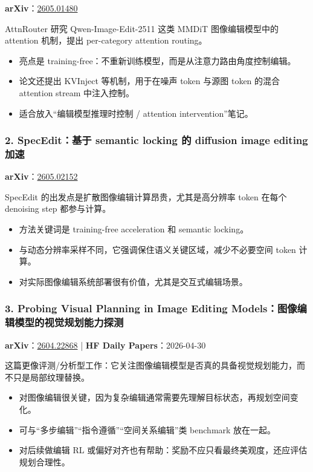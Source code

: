 \textbf{arXiv}：\href{https://arxiv.org/abs/2605.01480}{2605.01480}

AttnRouter 研究 Qwen-Image-Edit-2511 这类 MMDiT 图像编辑模型中的 attention 机制，提出 per-category attention routing。

\begin{itemize}[leftmargin=1.5em]
  \item 亮点是 training-free：不重新训练模型，而是从注意力路由角度控制编辑。
  \item 论文还提出 KVInject 等机制，用于在噪声 token 与源图 token 的混合 attention stream 中注入控制。
  \item 适合放入“编辑模型推理时控制 / attention intervention”笔记。
\end{itemize}

\subsubsection{2. SpecEdit：基于 semantic locking 的 diffusion image editing 加速}

\textbf{arXiv}：\href{https://arxiv.org/abs/2605.02152}{2605.02152}

SpecEdit 的出发点是扩散图像编辑计算昂贵，尤其是高分辨率 token 在每个 denoising step 都参与计算。

\begin{itemize}[leftmargin=1.5em]
  \item 方法关键词是 training-free acceleration 和 semantic locking。
  \item 与动态分辨率采样不同，它强调保住语义关键区域，减少不必要空间 token 计算。
  \item 对实际图像编辑系统部署很有价值，尤其是交互式编辑场景。
\end{itemize}

\subsubsection{3. Probing Visual Planning in Image Editing Models：图像编辑模型的视觉规划能力探测}

\textbf{arXiv}：\href{https://arxiv.org/abs/2604.22868}{2604.22868} | \textbf{HF Daily Papers}：2026-04-30

这篇更像评测/分析型工作：它关注图像编辑模型是否真的具备视觉规划能力，而不只是局部纹理替换。

\begin{itemize}[leftmargin=1.5em]
  \item 对图像编辑很关键，因为复杂编辑通常需要先理解目标状态，再规划空间变化。
  \item 可与“多步编辑”“指令遵循”“空间关系编辑”类 benchmark 放在一起。
  \item 对后续做编辑 RL 或偏好对齐也有帮助：奖励不应只看最终美观度，还应评估规划合理性。
\end{itemize}

